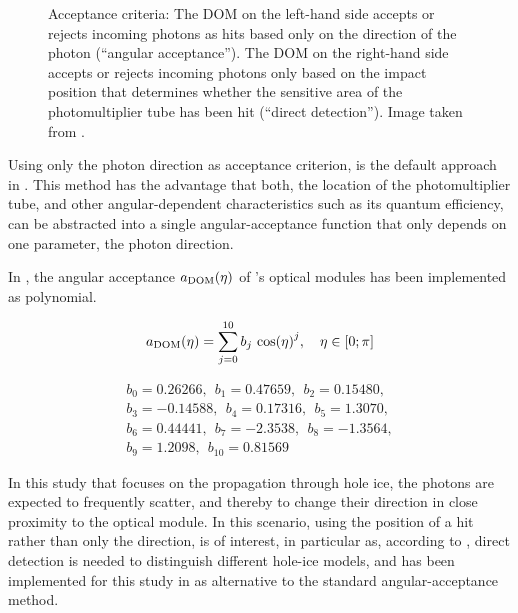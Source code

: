 \begin{figure}[htbp]
  \centering
  \caption{Acceptance criteria: The DOM on the left-hand side accepts or rejects incoming photons as hits based only on the direction of the photon (``angular acceptance''). The DOM on the right-hand side accepts or rejects incoming photons only based on the impact position that determines whether the sensitive area of the photomultiplier tube has been hit (``direct detection''). Image taken from \cite[slide 17]{martinspicehddard}.}
  \label{fig:kieQuoh1}
\end{figure}

Using only the photon direction as acceptance criterion, is the default
approach in \clsim. This method has the advantage that both, the
location of the photomultiplier tube, and other angular-dependent
characteristics such as its quantum efficiency, can be abstracted into a
single angular-acceptance function that only depends on one parameter,
the photon direction.

In \clsim, the angular acceptance \(a_\text{DOM}(\eta)\) of \icecube's optical
modules has been implemented as polynomial.

\begin{equation}
  a_\text{DOM}(\eta) = \sum_{j = 0}^{10} b_j\,\cos(\eta)^j, \ \ \ \eta \in [0; \pi]
  \label{eq:anominal}
\end{equation}

\begin{gather*}
   b_0 =  0.26266,  \ \  b_1    =  0.47659,   \ \ b_2 =  0.15480,  \\
   b_3 = -0.14588,  \ \  b_4    =  0.17316,   \ \ b_5 =  1.3070,   \\
   b_6 =  0.44441,  \ \  b_7    = -2.3538,    \ \ b_8 = -1.3564,   \\
   b_9 =  1.2098,   \ \  b_{10} =  0.81569
\end{gather*}


In this study that focuses on the propagation through hole ice, the
photons are expected to frequently scatter, and thereby to change their
direction in close proximity to the optical module. In this scenario,
using the position of a hit rather than only the direction, is of
interest, in particular as, according to \cite{martinspicehddard},
direct detection is needed to distinguish different hole-ice models, and
has been implemented for this study in \clsim as alternative to the
standard angular-acceptance method.

